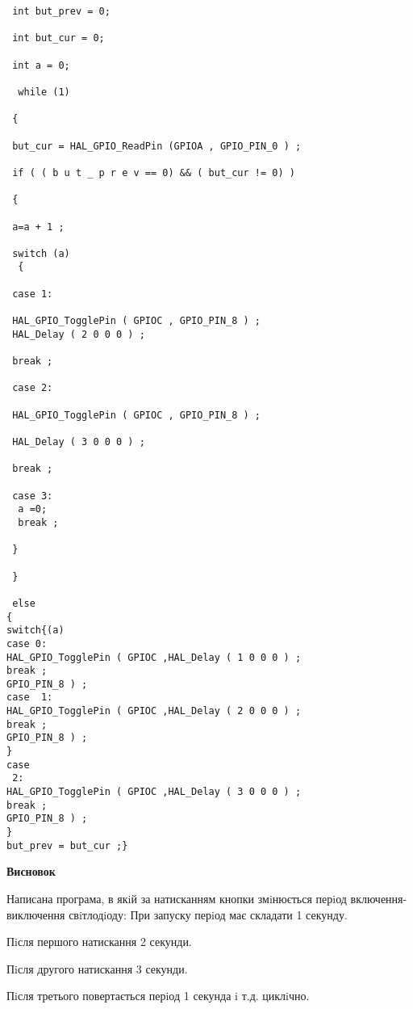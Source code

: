 \documentclass[a4paper,14pt]{extreport}
\begin{document}
\begin{verbatim}
 int but_prev = 0;
 
 int but_cur = 0;
 
 int a = 0;
 
  while (1)
 
 {
 
 but_cur = HAL_GPIO_ReadPin (GPIOA , GPIO_PIN_0 ) ;
 
 if ( ( b u t _ p r e v == 0) && ( but_cur != 0) )
 
 {
 
 a=a + 1 ;
 
 switch (a)
  {
 
 case 1:
 
 HAL_GPIO_TogglePin ( GPIOC , GPIO_PIN_8 ) ; 
 HAL_Delay ( 2 0 0 0 ) ;
 
 break ;
 
 case 2:
 
 HAL_GPIO_TogglePin ( GPIOC , GPIO_PIN_8 ) ;
 
 HAL_Delay ( 3 0 0 0 ) ;
 
 break ;
 
 case 3:
  a =0;
  break ;
 
 }
 
 }

 else
{
switch{(a)
case 0:
HAL_GPIO_TogglePin ( GPIOC ,HAL_Delay ( 1 0 0 0 ) ;
break ;
GPIO_PIN_8 ) ;
case  1:
HAL_GPIO_TogglePin ( GPIOC ,HAL_Delay ( 2 0 0 0 ) ;
break ;
GPIO_PIN_8 ) ;
}
case
 2:
HAL_GPIO_TogglePin ( GPIOC ,HAL_Delay ( 3 0 0 0 ) ;
break ;
GPIO_PIN_8 ) ;
}
but_prev = but_cur ;}
\end{verbatim}




\begin{center}
\textbf{Висновок}
\end{center}

Написана програма, в якiй за натисканням кнопки змiнюється перiод
включення-виключення свiтлодiоду: 
 При запуску перiод має складати 1 секунду.
 
 Пiсля першого натискання 2 секунди.
 
 Пiсля другого натискання 3 секунди.
 
 Пiсля третього повертається перiод 1 секунда i т.д. циклiчно.
\end{document}
